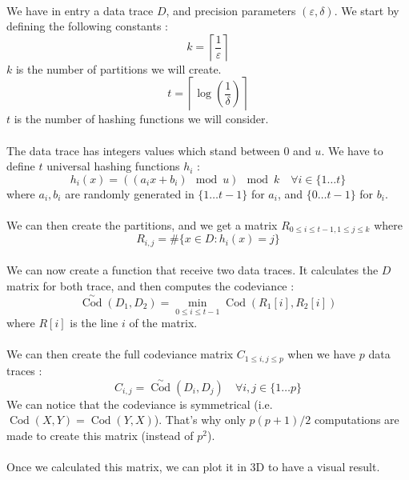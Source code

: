 \documentclass[a4paper]{article}%
\DeclareMathOperator{\Cod}{Cod}
\newcommand{\CodSk}{\overset{\sim}{\Cod}}
\begin{document}
\paragraph{}We have in entry a data trace $D$, and precision parameters $(\varepsilon, \delta)$. We start by defining the following constants :
	\[ k =\left\lceil \frac{1}{\varepsilon} \right\rceil \]
$k$ is the number of partitions we will create.
	\[ t = \left\lceil \log(\frac{1}{\delta}) \right\rceil \]
$t$ is the number of hashing functions we will consider.
	
\paragraph{}The data trace has integers values which stand between $0$ and $u$. We have to define $t$ universal hashing functions $h_i$ :
	\[ h_i(x) = ((a_ix+b_i) \mod u) \mod k \quad \forall i \in \lbrace 1 \ldots t \rbrace \]
where $a_i, b_i$ are randomly generated in $\lbrace 1 \dots t-1 \rbrace$ for $a_i$, and $\lbrace 0 \ldots t-1 \rbrace$ for $b_i$.

\paragraph{}We can then create the partitions, and we get a matrix $R_{0 \leq i \leq t-1, 1 \leq j \leq k}$ where 
 	\[ R_{i,j} = \# \lbrace x \in D : h_i(x) = j \rbrace \]
 	
\paragraph{}We can now create a function that receive two data traces. It calculates the $D$ matrix for both trace, and then computes the codeviance :
	\[ \CodSk(D_1, D_2) = \underset{0 \leq i \leq t-1}{\min} \Cod(R_1[i], R_2[i]) \]
where $R[i]$ is the line $i$ of the matrix.

\paragraph{}We can then create the full codeviance matrix $C_{1 \leq i,j \leq p}$ when we have $p$ data traces :
	\[ C_{i,j} = \CodSk(D_i, D_j) \quad \forall i,j \in \lbrace 1 \ldots p \rbrace \]
We can notice that the codeviance is symmetrical (i.e. $\Cod(X,Y) = \Cod(Y,X)$). That's why only $p(p+1)/2$ computations are made to create this matrix (instead of $p^2$).

\paragraph{}Once we calculated this matrix, we can plot it in 3D to have a visual result.
\end{document}
